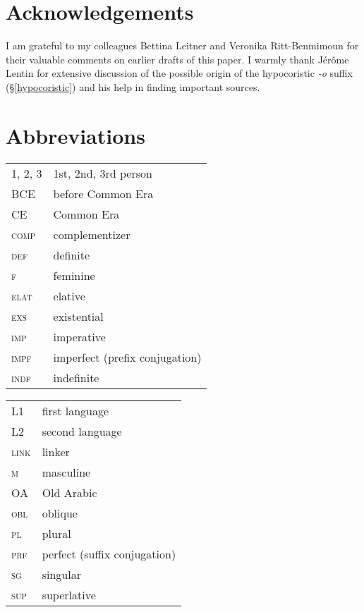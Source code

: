 \documentclass[output=paper]{langsci/langscibook}
\begin{document}
\section*{Acknowledgements}
I am grateful to my colleagues Bettina Leitner and Veronika Ritt-Benmimoun for their valuable comments on earlier drafts of this paper. I warmly thank Jérôme Lentin for extensive discussion of the possible origin of the hypocoristic \textit{-o} suffix (§\ref{hypocoristic}) and his help in finding important sources.

\section*{Abbreviations}

\begin{tabularx}{.5\textwidth}{@{}lQ@{}}
\textsc{1, 2, 3} & 1st, 2nd, 3rd person \\
BCE & before Common Era \\
CE & Common Era \\
\textsc{comp} & complementizer \\
\textsc{def} & definite \\
\textsc{f} & feminine \\
\textsc{elat} & elative \\
\textsc{exs} & existential \\
\textsc{imp} & imperative \\
\textsc{impf} & imperfect (prefix conjugation) \\
\textsc{indf} & indefinite \\
\end{tabularx}%
\begin{tabularx}{.5\textwidth}{@{}lQ@{}}
L1 & first language \\
L2 & second language \\
\textsc{link} & linker \\
\textsc{m} & masculine \\
OA & Old Arabic \\
\textsc{obl} & oblique \\
\textsc{pl} & plural \\
\textsc{prf} & perfect (suffix conjugation) \\
\textsc{sg} & singular \\
\textsc{sup} & superlative \\
\end{tabularx}%

\sloppy
\printbibliography[heading=subbibliography,notkeyword=this] 
\end{document}
